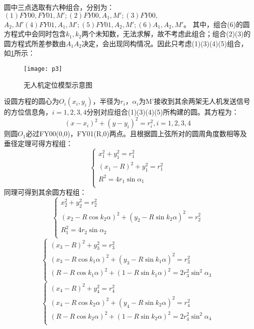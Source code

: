 \documentclass{cumcmthesis}
\begin{document}
圆中三点选取有六种组合，分别为：$(1)FY00,FY01,M';(2)FY00,A_1,M';(3)FY00,$ $A_2,M'(4)FY01,A_1,M';(5)FY01,A_2,M';(6)A_1,A_2,M'$。
其中，组合(6)的圆方程式中会同时包含$k_1,k_2$两个未知数，无法求解，故不考虑此组合；组合(2)(3)的圆方程式所差参数由$A_1A_2$决定，会出现同构情况。因此只考虑(1)(3)(4)(5)组合，如\cref{fig:p3}所示：
\begin{figure}[H]
	\centering
	\texttt{[image: p3]}
	\caption{无人机定位模型示意图}
	\label{fig:p3}
\end{figure}
设圆方程的圆心为$O_i(x_i,y_i)$，半径为$r_i$，$\alpha_i$为M'接收到其余两架无人机发送信号的方位信息角，$i = 1,2,3,4$分别对应组合(1)(3)(4)(5)所构建的圆。其方程为：
\begin{equation}
	(x-x_i)^2+(y-y_i)^2=r_i^2,i=1,2,3,4
	\label{eq:14}
\end{equation}
则圆$O_1$必过FY00(0,0)，FY01(R,0)两点。且根据圆上弦所对的圆周角度数相等及垂径定理可得方程组：
\[
	\begin{cases}
		x_1^2+y_1^2=r_1^2\\
		(x_1-R)^2+y_1^2=r_1^2\\
		R^2=4r_1\sin\alpha_{1}\\
	\end{cases}
	\label{eq:11}
\]
同理可得到其余圆方程组：
\[
	\begin{cases}
		x_2^2+y_2^2=r_2^2\\
		(x_2-R\cos k_2 \alpha)^2+(y_2-R\sin k_2 \alpha)^2=r_2^2\\
		R_1^2=4r_2\sin\alpha_2\\
	\end{cases}
	\label{eq:12}
\]
\[
	\begin{cases}
		(x_3-R)^2+y_3^2=r_3^2\\
		(x_3-R\cos k_1 \alpha)^2+(y_3-R\sin k_1 \alpha)^2=r_3^2\\
		(R-R\cos k_1 \alpha)^2+(1-R\sin k_1 \alpha)^2=2r_3^2 \sin^2 \alpha_3\\
	\end{cases}
	\label{eq:13}
\]
\[
	\begin{cases}
		(x_4-R)^2+y_4^2=r_4^2\\
		(x_4-R\cos k_2 \alpha)^2+(y_4-R\sin k_2 \alpha)^2=r_4^2\\
		(R-R\cos k_2 \alpha)^2+(1-R\sin k_2 \alpha)^2=2r_4^2 \sin^2 \alpha_4\\
	\end{cases}
	\label{eq:15}
\]
\end{document}
